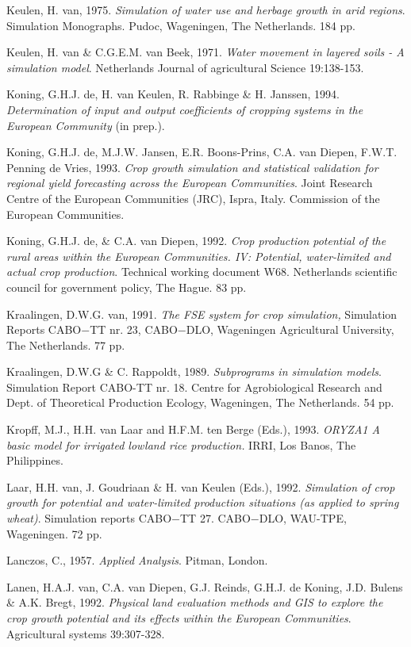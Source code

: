 Keulen, H. van, 1975. {\it Simulation of water use and herbage growth in arid regions\/}. Simulation
Monographs. Pudoc, Wageningen, The Netherlands. 184 pp.

Keulen, H. van \& C.G.E.M. van Beek, 1971. {\it Water movement in layered soils - A simulation model\/}.
Netherlands Journal of agricultural Science 19:138-153.

Koning, G.H.J. de, H. van Keulen, R. Rabbinge \& H. Janssen, 1994. {\it Determination of input and
output coefficients of cropping systems in the European Community\/} (in prep.).

Koning, G.H.J. de, M.J.W. Jansen, E.R. Boons-Prins, C.A. van Diepen, F.W.T. Penning de Vries,
1993. {\it Crop growth simulation and statistical validation for regional yield forecasting across the
European Communities\/}. Joint Research Centre of the European Communities (JRC), Ispra, Italy.
Commission of the European Communities.

Koning, G.H.J. de, \& C.A. van Diepen, 1992. {\it Crop production potential of the rural areas within
the European Commun\-ities. IV: Potential, water-limited and actual crop production\/}. Technical
working document W68. Netherlands scientific council for government policy, The Hague. 83 pp.

Kraalingen, D.W.G. van, 1991. {\it The FSE system for crop simulation,\/} Simulation Reports CABO$-$TT
nr. 23, CABO$-$DLO, Wageningen Agricultural University, The Netherlands. 77 pp. 

Kraalingen, D.W.G \& C. Rappoldt, 1989. {\it Subprograms in simulation models\/}. Simulation Report
CABO-TT nr. 18. Centre for Agrobiological Research and Dept. of Theoretical Production Ecology,
Wageningen, The Netherlands. 54 pp.

Kropff, M.J., H.H. van Laar and H.F.M. ten Berge (Eds.), 1993. {\it ORYZA1 A basic model for
irrigated lowland rice production.\/} IRRI, Los Banos, The Philippines.

Laar, H.H. van, J. Goudriaan \& H. van Keulen (Eds.), 1992. {\it Simula\-tion of crop growth for
potential and water-limited production situations (as applied to spring wheat)\/}. Simulation reports
CABO$-$TT 27. CABO$-$DLO, WAU-TPE, {\nobreak}Wageningen. 72 pp.

Lanczos, C., 1957. {\it Applied Analysis\/}. Pitman, London.

Lanen, H.A.J. van, C.A. van Diepen, G.J. Reinds, G.H.J. de Koning, J.D. Bulens \& A.K. Bregt,
1992. {\it Physical land evaluation methods and GIS to explore the crop growth potential and its effects
within the European Commun\-ities\/}. Agricultural systems 39:307-328.

